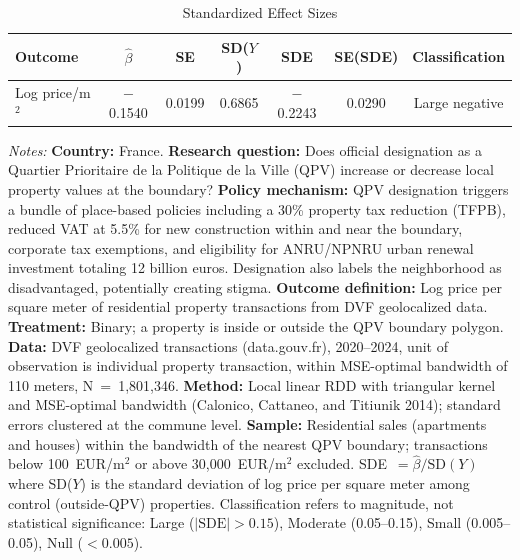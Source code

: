 \begin{table}[htbp]
\centering
\caption{Standardized Effect Sizes}
\label{tab:sde}
\begin{threeparttable}
\begin{tabular}{lcccccc}
\toprule
Outcome & $\hat{\beta}$ & SE & SD($Y$) & SDE & SE(SDE) & Classification \\
\midrule
Log price/m$^2$ & $-$0.1540 & 0.0199 & 0.6865 & $-$0.2243 & 0.0290 & Large negative \\
\bottomrule
\end{tabular}
\begin{tablenotes}
\footnotesize
\item \textit{Notes:}
\textbf{Country:} France.
\textbf{Research question:} Does official designation as a Quartier Prioritaire de la Politique de la Ville (QPV) increase or decrease local property values at the boundary?
\textbf{Policy mechanism:} QPV designation triggers a bundle of place-based policies including a 30\% property tax reduction (TFPB), reduced VAT at 5.5\% for new construction within and near the boundary, corporate tax exemptions, and eligibility for ANRU/NPNRU urban renewal investment totaling 12 billion euros. Designation also labels the neighborhood as disadvantaged, potentially creating stigma.
\textbf{Outcome definition:} Log price per square meter of residential property transactions from DVF geolocalized data.
\textbf{Treatment:} Binary; a property is inside or outside the QPV boundary polygon.
\textbf{Data:} DVF geolocalized transactions (data.gouv.fr), 2020--2024, unit of observation is individual property transaction, within MSE-optimal bandwidth of 110 meters, N~=~1,801,346.
\textbf{Method:} Local linear RDD with triangular kernel and MSE-optimal bandwidth (Calonico, Cattaneo, and Titiunik 2014); standard errors clustered at the commune level.
\textbf{Sample:} Residential sales (apartments and houses) within the bandwidth of the nearest QPV boundary; transactions below 100~EUR/m$^2$ or above 30,000~EUR/m$^2$ excluded.
SDE~$= \hat{\beta} / \text{SD}(Y)$ where SD($Y$) is the standard deviation of log price per square meter among control (outside-QPV) properties.
Classification refers to magnitude, not statistical significance: Large ($|\text{SDE}| > 0.15$), Moderate (0.05--0.15), Small (0.005--0.05), Null ($< 0.005$).
\end{tablenotes}
\end{threeparttable}
\end{table}
